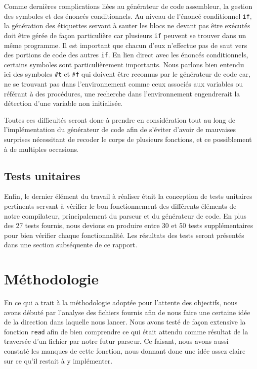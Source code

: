 \documentclass[12pt]{article}
\begin{document}
Comme dernières complications liées au générateur de code assembleur, la gestion des symboles et des énoncés conditionnels. Au niveau de l'énoncé conditionnel \texttt{if}, la génération des étiquettes servant à sauter les blocs ne devant pas être exécutés doit être gérée de façon particulière car plusieurs \texttt{if} peuvent se trouver dans un même programme. Il est important que chacun d'eux n'effectue pas de saut vers des portions de code des autres \texttt{if}. En lien direct avec les énoncés conditionnels, certains symboles sont particulièrement importants. Nous parlons bien entendu ici des symboles \texttt{\#t} et \texttt{\#f} qui doivent être reconnus par le générateur de code car, ne se trouvant pas dans l'environnement comme ceux associés aux variables ou référant à des procédures, une recherche dans l'environnement engendrerait la détection d'une variable non initialisée.

Toutes ces difficultés seront donc à prendre en considération tout au long de l'implémentation du générateur de code afin de s'éviter d'avoir de mauvaises surprises nécessitant de recoder le corps de plusieurs fonctions, et ce possiblement à de multiples occasions.

\subsection{Tests unitaires}
Enfin, le dernier élément du travail à réaliser était la conception de tests unitaires pertinents servant à vérifier le bon fonctionnement des différents éléments de notre compilateur, principalement du parseur et du générateur de code. En plus des 27 tests fournis, nous devions en produire entre 30 et 50 tests supplémentaires pour bien vérifier chaque fonctionnalité. Les résultats des tests seront présentés dans une section subséquente de ce rapport.


\section{Méthodologie}
En ce qui a trait à la méthodologie adoptée pour l'attente des objectifs, nous avons débuté par l'analyse des fichiers fournis afin de nous faire une certaine idée de la direction dans laquelle nous lancer. Nous avons testé de façon extensive la fonction \texttt{read} afin de bien comprendre ce qui était attendu comme résultat de la traversée d'un fichier par notre futur parseur. Ce faisant, nous avons aussi constaté les manques de cette fonction, nous donnant donc une idée assez claire sur ce qu'il restait à y implémenter.
\end{document}
